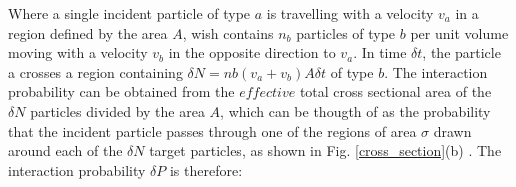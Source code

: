 Where a single incident particle of type $a$ is travelling with a velocity $v_{a}$ in a region defined by the area $A$, wish contains $n_{b}$ particles of type $b$ per unit volume moving with a velocity $v_{b}$ in the opposite direction to $v_{a}$. In  time $\delta t$, the particle a crosses a region containing $\delta N= nb(v_{a}+v_{b}) A \delta t$ of type $b$. The interaction probability can be obtained from the $effective$ total cross sectional area of the $\delta N$ particles divided by the area $A$, which can be thougth of as the probability that the incident particle passes through one of the regions of area $\sigma$ drawn around each of the $\delta N$ target particles, as shown in Fig. \ref{cross_section}(b) \cite{thomson_2013}. The interaction probability $\delta P$ is therefore:










